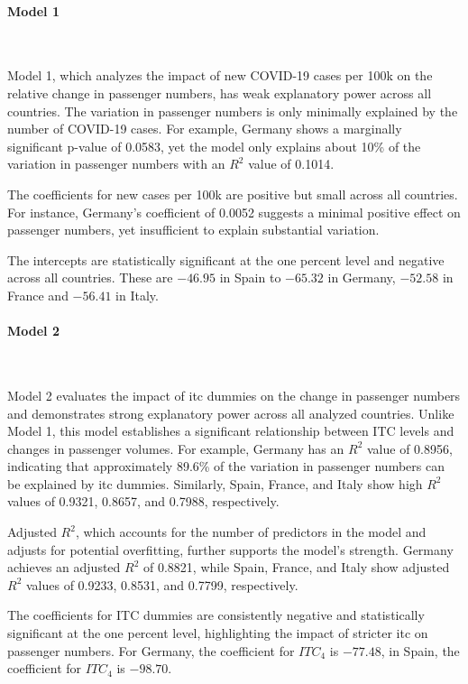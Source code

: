 \documentclass[12pt,onehalfspacing,headsepline,oneside,openright,a4paper, fleqn]{report}
\begin{document}
\paragraph{Model 1}
\

Model 1, which analyzes the impact of new COVID-19 cases per 100k on the relative change in passenger numbers, has weak explanatory power across all countries. The variation in passenger numbers is only minimally explained by the number of COVID-19 cases. For example, Germany shows a marginally significant p-value of 0.0583, yet the model only explains about 10\% of the variation in passenger numbers with an $R^2$ value of 0.1014. 

The coefficients for new cases per 100k are positive but small across all countries. For instance, Germany's coefficient of 0.0052 suggests a minimal positive effect on passenger numbers, yet insufficient to explain substantial variation.

The intercepts are statistically significant at the one percent level and negative across all countries. These are $-46.95$ in Spain to $-65.32$ in Germany, $-52.58$ in France and $-56.41$ in Italy. 

\paragraph{Model 2}
\

Model 2 evaluates the impact of \gls{itc} dummies on the change in passenger numbers and demonstrates strong explanatory power across all analyzed countries. Unlike Model 1, this model establishes a significant relationship between ITC levels and changes in passenger volumes. For example, Germany has an $R^2$ value of 0.8956, indicating that approximately 89.6\% of the variation in passenger numbers can be explained by \gls{itc} dummies. Similarly, Spain, France, and Italy show high $R^2$ values of 0.9321, 0.8657, and 0.7988, respectively.

Adjusted $R^2$, which accounts for the number of predictors in the model and adjusts for potential overfitting, further supports the model's strength. Germany achieves an adjusted $R^2$ of 0.8821, while Spain, France, and Italy show adjusted $R^2$ values of 0.9233, 0.8531, and 0.7799, respectively.

The coefficients for ITC dummies are consistently negative and statistically significant at the one percent level, highlighting the impact of stricter \gls{itc} on passenger numbers. For Germany, the coefficient for $ITC_4$ is $-77.48$, in Spain, the coefficient for $ITC_4$ is $-98.70$. 
\end{document}
